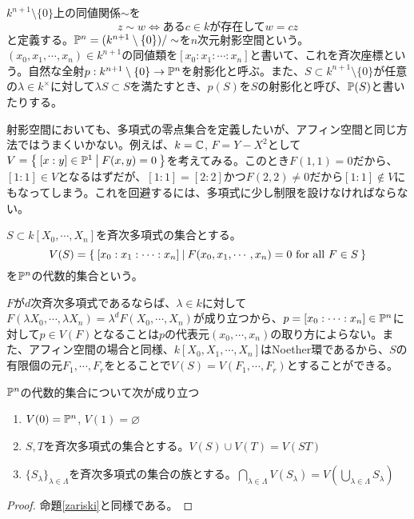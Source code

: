 \documentclass{ltjsreport}
\begin{document}
\begin{defin}
  $k^{n+1}\setminus\{0\}$上の同値関係$\sim$を
  \[
  z\sim w\Leftrightarrow \text{ある$c\in k$が存在して}w=cz  
  \]
  と定義する。$\mathbb{P}^n=(k^{n+1}\setminus\{0\})/\sim$を$n$次元射影空間という。$(x_0,x_1,\cdots,x_n)\in k^{n+1}$の同値類を$[x_0:x_1:\cdots:x_n]$と書いて、これを斉次座標という。自然な全射$p:k^{n+1}\setminus\{0\}\rightarrow \mathbb{P}^n$を射影化と呼ぶ。また、$S\subset k^{n+1}\setminus\{0\}$が任意の$\lambda\in k^\times $に対して$\lambda S\subset S$を満たすとき、$p(S)$を$S$の射影化と呼び、$\mathbb{P}(S)$と書いたりする。
\end{defin}

射影空間においても、多項式の零点集合を定義したいが、アフィン空間と同じ方法ではうまくいかない。例えば、$k=\mathbb{C}$, $F=Y-X^2$として$V=\left\{\:[x:y]\in\mathbb{P}^1\:\middle|\:F(x,y)=0\:\right\}$を考えてみる。このとき$F(1,1)=0$だから、$[1:1]\in V$となるはずだが、$[1:1]=[2:2]$かつ$F(2,2)\neq 0$だから$[1:1]\notin V$にもなってしまう。これを回避するには、多項式に少し制限を設けなければならない。

\begin{defin}
  $S\subset k[X_0,\cdots,X_n]$を斉次多項式の集合とする。
  \[
  V(S)=\left\{\:[x_0:x_1:\cdots:x_n]\:\middle|\:F(x_0,x_1,\cdots,x_n)=0\text{ for all }F\in S\:\right\}  
  \]
  を$\mathbb{P}^n$の代数的集合という。
\end{defin}

$F$が$d$次斉次多項式であるならば、$\lambda\in k$に対して$F(\lambda X_0,\cdots,\lambda X_n)=\lambda^dF(X_0,\cdots,X_n)$が成り立つから、$p=[x_0:\cdots:x_n]\in \mathbb{P}^n$に対して$p\in V(F)$となることは$p$の代表元$(x_0,\cdots,x_n)$の取り方によらない。また、アフィン空間の場合と同様、$k[X_0,X_1,\cdots,X_n]$はNoether環であるから、$S$の有限個の元$F_1,\cdots,F_r$をとることで$V(S)=V(F_1,\cdots,F_r)$とすることができる。

\begin{prop}\label{zariski_for_proj}
  $\mathbb{P}^n$の代数的集合について次が成り立つ
  \begin{enumerate}
    \item $V(0)=\mathbb{P}^n$, $V(1)=\varnothing$
    \item $S,T$を斉次多項式の集合とする。$V(S)\cup V(T)=V(ST)$
    \item $\{S_\lambda\}_{\lambda\in\Lambda}$を斉次多項式の集合の族とする。$\bigcap_{\lambda\in\Lambda}V(S_\lambda)=V(\bigcup_{\lambda\in\Lambda}S_\lambda)$
  \end{enumerate}
\end{prop}

\begin{proof}
  命題\ref{zariski}と同様である。
\end{proof}
\end{document}
